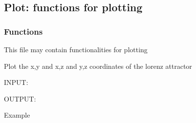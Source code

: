 \documentclass[letterpaper,10pt,english]{sphinxmanual}
\begin{document}
\subsection{Plot: functions for plotting}
\label{\detokenize{Functions:plot-functions-for-plotting}}

\subsubsection{Functions}
\label{\detokenize{Functions:id1}}\label{\detokenize{Functions:module-lorenz.plot}}
This file may contain functionalities for plotting

\begin{fulllineitems}
\label{\detokenize{Functions:lorenz.plot.plot_2d}}
Plot the x,y and x,z and y,z coordinates of the lorenz attractor

INPUT:

\begin{sphinxVerbatim}[commandchars=\\\{\}]
      
      \PYG{p}{[}\PYG{p}{]}
     
      
     
\end{sphinxVerbatim}

OUTPUT:

\begin{sphinxVerbatim}[commandchars=\\\{\}]
   
\end{sphinxVerbatim}

Example

\begin{sphinxVerbatim}[commandchars=\\\{\}]
 
\end{sphinxVerbatim}

\end{fulllineitems}
\end{document}
